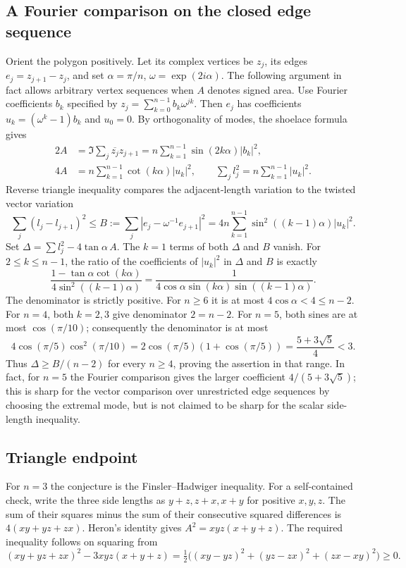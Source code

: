 \documentclass[11pt,a4paper]{article}
\numberwithin{equation}{section}
\theoremstyle{definition}
\theoremstyle{remark}
\begin{document}
\subsection*{A Fourier comparison on the closed edge sequence}
Orient the polygon positively. Let its complex vertices be $z_j$, its edges $e_j=z_{j+1}-z_j$, and set $\alpha=\pi/n$, $\omega=\exp(2i\alpha)$. The following argument in fact allows arbitrary vertex sequences when $A$ denotes signed area. Use Fourier coefficients $b_k$ specified by $z_j=\sum_{k=0}^{n-1}b_k\omega^{jk}$. Then $e_j$ has coefficients $u_k=(\omega^k-1)b_k$ and $u_0=0$. By orthogonality of modes, the shoelace formula gives
\[
 \begin{split}
 2A&=\Im\sum_j\overline{z_j}z_{j+1}
 =n\sum_{k=1}^{n-1}\sin(2k\alpha)|b_k|^2,\\
 4A&=n\sum_{k=1}^{n-1}\cot(k\alpha)|u_k|^2,\qquad
 \sum_j l_j^2=n\sum_{k=1}^{n-1}|u_k|^2.
 \end{split}
\]
Reverse triangle inequality compares the adjacent-length variation to the twisted vector variation
\[
 \sum_j(l_j-l_{j+1})^2\le B:=
 \sum_j|e_j-\omega^{-1}e_{j+1}|^2
 =4n\sum_{k=1}^{n-1}\sin^2((k-1)\alpha)|u_k|^2 .
\]
Set $\Delta=\sum l_j^2-4\tan\alpha\,A$. The $k=1$ terms of both $\Delta$ and $B$ vanish. For $2\le k\le n-1$, the ratio of the coefficients of $|u_k|^2$ in $\Delta$ and $B$ is exactly
\[
 \frac{1-\tan\alpha\cot(k\alpha)}{4\sin^2((k-1)\alpha)}
 =\frac{1}{4\cos\alpha\sin(k\alpha)\sin((k-1)\alpha)} .
\]
The denominator is strictly positive. For $n\ge6$ it is at most $4\cos\alpha<4\le n-2$. For $n=4$, both $k=2,3$ give denominator $2=n-2$. For $n=5$, both sines are at most $\cos(\pi/10)$; consequently the denominator is at most
\[
 4\cos(\pi/5)\cos^2(\pi/10)
 =2\cos(\pi/5)(1+\cos(\pi/5))=\frac{5+3\sqrt5}{4}<3.
\]
Thus $\Delta\ge B/(n-2)$ for every $n\ge4$, proving the assertion in that range. In fact, for $n=5$ the Fourier comparison gives the larger coefficient $4/(5+3\sqrt5)$; this is sharp for the vector comparison over unrestricted edge sequences by choosing the extremal mode, but is not claimed to be sharp for the scalar side-length inequality.

\subsection*{Triangle endpoint}
For $n=3$ the conjecture is the Finsler--Hadwiger inequality. For a self-contained check, write the three side lengths as $y+z,z+x,x+y$ for positive $x,y,z$. The sum of their squares minus the sum of their consecutive squared differences is $4(xy+yz+zx)$. Heron's identity gives $A^2=xyz(x+y+z)$. The required inequality follows on squaring from
\[
 (xy+yz+zx)^2-3xyz(x+y+z)
 =\tfrac12\big((xy-yz)^2+(yz-zx)^2+(zx-xy)^2\big)\ge0 .
\]
\end{document}
